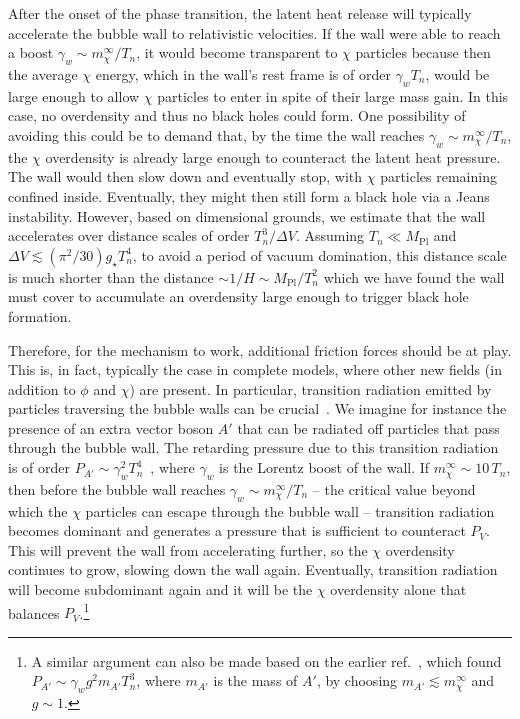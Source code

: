 \documentclass[
onecolumn, %
11pt, %
tightenlines,
superscriptaddress, %
nofootinbib, %
preprintnumbers, %
prd %
]{revtex4-1}
\begin{document}
After the onset of the phase transition, the latent heat release will typically accelerate the bubble wall to relativistic velocities.  If the wall were able to reach a boost $\gamma_w \sim m_\chi^\infty / T_n$, it would become transparent to $\chi$ particles because then the average $\chi$ energy, which in the wall's rest frame is of order $\gamma_w T_n$, would be large enough to allow $\chi$ particles to enter in spite of their large mass gain. In this case, no overdensity and thus no black holes could form.  One possibility of avoiding this could be to demand that, by the time the wall reaches $\gamma_w \sim m_\chi^\infty / T_n$, the $\chi$ overdensity is already large enough to counteract the latent heat pressure.  The wall would then slow down and eventually stop, with $\chi$ particles remaining confined inside. Eventually, they might then still form a black hole via a Jeans instability. However, based on dimensional grounds, we estimate that the wall accelerates over distance scales of order $T_n^3 / \Delta V$. Assuming $T_n \ll M_\text{Pl}$ and $\Delta V \lesssim (\pi^2/30) g_\star T_n^4$, to avoid a period of vacuum domination, this distance scale is much shorter than the distance $\sim 1/H \sim M_\text{Pl}/T_n^2$ which we have found the wall must cover to accumulate an overdensity large enough to trigger black hole formation.

Therefore, for the mechanism to work, additional friction forces should be at play. This is, in fact, typically the case in complete models, where other new fields (in addition to $\phi$ and $\chi$) are present. In particular, transition radiation emitted by particles traversing the bubble walls can be crucial~\cite{Bodeker:2017cim, Hoche:2020ysm}.  We imagine for instance the presence of an extra vector boson $A'$ that can be radiated off particles that pass through the bubble wall.  The retarding pressure due to this transition radiation is of order $P_{A'} \sim \gamma_w^2 T_n^4$~\cite{Hoche:2020ysm}, where $\gamma_w$ is the Lorentz boost of the wall. If $m_\chi^\infty \sim 10\,T_n$, then before the bubble wall reaches $\gamma_w \sim m_\chi^\infty / T_n$ -- the critical value beyond which the $\chi$ particles can escape through the bubble wall -- transition radiation becomes dominant and generates a pressure that is sufficient to counteract $P_V$. This will prevent the wall from accelerating further, so the $\chi$ overdensity continues to grow, slowing down the wall again. Eventually, transition radiation will become subdominant again and it will be the $\chi$ overdensity alone that balances $P_V$.\footnote{A similar argument can also be made based on the earlier ref.~\cite{Bodeker:2017cim}, which found $P_{A'} \sim \gamma_w g^2 m_{A'} T_n^3$, where $m_{A'}$ is the mass of $A'$, by choosing $m_{A'} \lesssim m_\chi^\infty$ and $g \sim 1$.}
\end{document}
